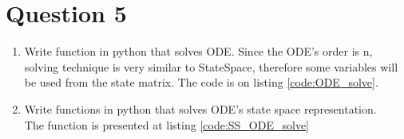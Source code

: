\documentclass[12pt,letterpaper]{article}
\begin{document}
\begin{enumerate}[leftmargin=!,labelindent=5pt]
    
\end{enumerate}

\section*{Question 5}
\setcounter{equation}{0}
\begin{enumerate}[leftmargin=!,labelindent=5pt]
    \item Write function in python that solves ODE.
    Since the ODE's order is n, solving technique is very similar to StateSpace, therefore some variables will be used from the state matrix. The code is on listing \ref{code:ODE_solve}. 
    
    
    \item Write functions in python that solves ODE's state space representation.\\
    The function is presented at listing \ref{code:SS_ODE_solve}
    
    

\end{enumerate}
\end{document}
